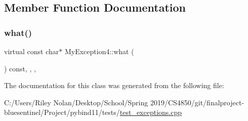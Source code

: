 \subsection{Member Function Documentation}
\mbox{\label{class_my_exception4_a60a67269d2544ba3d2be99889eff6538}} 
\subsubsection{\texorpdfstring{what()}{what()}}
{\footnotesize\ttfamily virtual const char$\ast$ My\+Exception4\+::what (\begin{DoxyParamCaption}{ }\end{DoxyParamCaption}) const\hspace{0.3cm}{\ttfamily [inline]}, {\ttfamily [override]}, {\ttfamily [virtual]}, {\ttfamily [noexcept]}}



The documentation for this class was generated from the following file\+:\begin{DoxyCompactItemize}
\item 
C\+:/\+Users/\+Riley Nolan/\+Desktop/\+School/\+Spring 2019/\+C\+S4850/git/finalproject-\/bluesentinel/\+Project/pybind11/tests/\mbox{\hyperlink{test__exceptions_8cpp}{test\+\_\+exceptions.\+cpp}}\end{DoxyCompactItemize}

